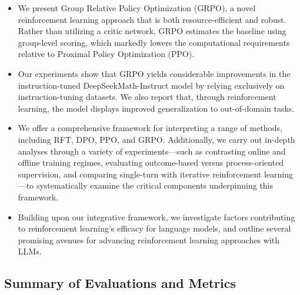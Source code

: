 \begin{itemize}[topsep=0pt]
    \item We present Group Relative Policy Optimization (GRPO), a novel reinforcement learning approach that is both resource-efficient and robust. Rather than utilizing a critic network, GRPO estimates the baseline using group-level scoring, which markedly lowers the computational requirements relative to Proximal Policy Optimization (PPO).
    \item Our experiments show that GRPO yields considerable improvements in the instruction-tuned DeepSeekMath-Instruct model by relying exclusively on instruction-tuning datasets. We also report that, through reinforcement learning, the model displays improved generalization to out-of-domain tasks.
    \item We offer a comprehensive framework for interpreting a range of methods, including RFT, DPO, PPO, and GRPO. Additionally, we carry out in-depth analyses through a variety of experiments—such as contrasting online and offline training regimes, evaluating outcome-based versus process-oriented supervision, and comparing single-turn with iterative reinforcement learning—to systematically examine the critical components underpinning this framework.
    \item Building upon our integrative framework, we investigate factors contributing to reinforcement learning's efficacy for language models, and outline several promising avenues for advancing reinforcement learning approaches with LLMs.
\end{itemize}

\subsection{Summary of Evaluations and Metrics}

